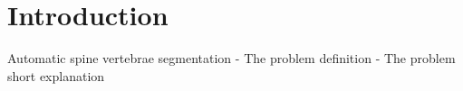 \chapter{Introduction}
\label{ch:introduction}

Automatic spine vertebrae segmentation 
- The problem definition
- The problem short explanation


